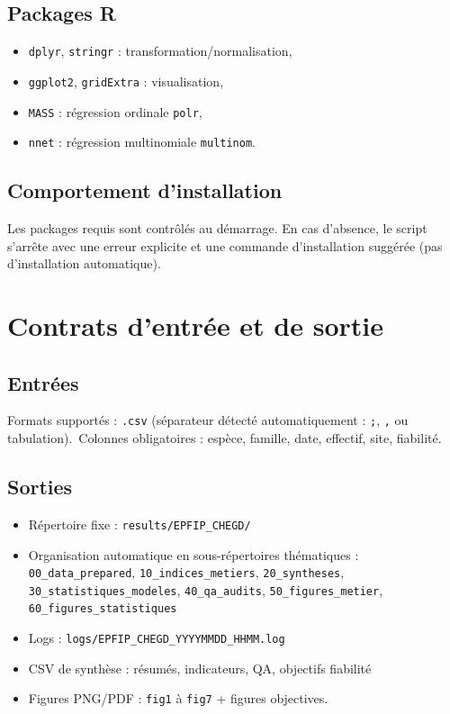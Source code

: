 \documentclass[11pt,a4paper]{article}
\begin{document}
\subsection{Packages R}
\begin{itemize}[leftmargin=1.2cm]
  \item \texttt{dplyr}, \texttt{stringr} : transformation/normalisation,
  \item \texttt{ggplot2}, \texttt{gridExtra} : visualisation,
  \item \texttt{MASS} : r\'egression ordinale \texttt{polr},
  \item \texttt{nnet} : r\'egression multinomiale \texttt{multinom}.
\end{itemize}

\subsection{Comportement d'installation}
Les packages requis sont contrôl\'es au d\'emarrage. En cas d'absence, le script s'arrête
avec une erreur explicite et une commande d'installation sugg\'er\'ee (pas d'installation automatique).

\section{Contrats d'entr\'ee et de sortie}
\subsection{Entr\'ees}
Formats support\'es : \texttt{.csv} (s\'eparateur d\'etect\'e automatiquement : \texttt{;}, \texttt{,} ou tabulation).\
Colonnes obligatoires : espèce, famille, date, effectif, site, fiabilit\'e.

\subsection{Sorties}
\begin{itemize}[leftmargin=1.2cm]
  \item R\'epertoire fixe :
  \texttt{results/EPFIP\_CHEGD/}
  \item Organisation automatique en sous-r\'epertoires th\'ematiques :
  \texttt{00\_data\_prepared}, \texttt{10\_indices\_metiers}, \texttt{20\_syntheses},
  \texttt{30\_statistiques\_modeles}, \texttt{40\_qa\_audits},
  \texttt{50\_figures\_metier}, \texttt{60\_figures\_statistiques}
  \item Logs :
  \texttt{logs/EPFIP\_CHEGD\_YYYYMMDD\_HHMM.log}
  \item CSV de synthèse : r\'esum\'es, indicateurs, QA, objectifs fiabilit\'e
  \item Figures PNG/PDF : \texttt{fig1} à \texttt{fig7} + figures objectives.
\end{itemize}
\end{document}
